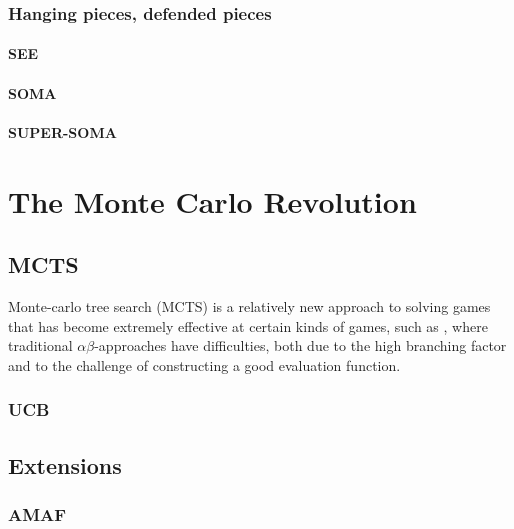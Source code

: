 \documentclass[10pt,dvipdfmx,letterpaper]{report}
\newcommand{\ab}{{$\alpha\beta$}}
\newcommand{\g}[1]{{\sc{#1}}\index{{\sc{#1}}}}
\begin{document}
\section{Hanging pieces, defended pieces}

\subsection{SEE}
\subsection{SOMA}
\subsection{SUPER-SOMA}

\part{The Monte Carlo Revolution}

\chapter{MCTS}
\label{chap-mcts}

Monte-carlo tree search (MCTS) is a relatively new approach to solving
games that has become extremely effective at certain kinds of games, such
as \g{go}, where traditional \ab-approaches have difficulties, both
due to the high branching factor and to the challenge of constructing a good
evaluation function.

\section{UCB}


\chapter{Extensions}
\label{chap-mcts-extensions}

\section{AMAF}
\end{document}
